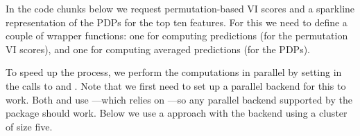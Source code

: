In the code chunks below we request permutation-based VI scores and a
sparkline representation of the PDPs for the top ten features. For this
we need to define a couple of wrapper functions: one for computing
predictions (for the permutation VI scores), and one for computing
averaged predictions (for the PDPs).

\begin{Schunk}
\end{Schunk}

To speed up the process, we perform the computations in parallel by
setting  in the calls to  and
. Note that we first need to set up a parallel
backend for this to work. Both  and  use
 \citep{R-plyr}---which relies on ---so any
parallel backend supported by the  package should work.
Below we use a  approach with the 
backend \citep{R-doParallel} using a cluster of size five.

